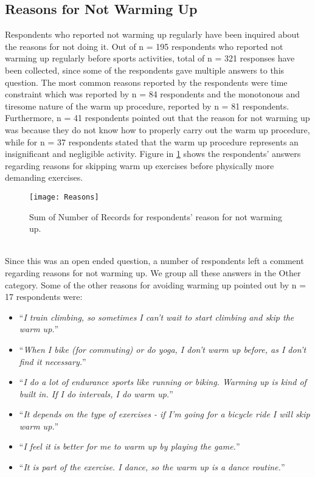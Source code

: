 \subsection{Reasons for Not Warming Up}
Respondents who reported not warming up regularly have been inquired about the reasons for not doing it.  Out of n = 195 respondents who reported not warming up regularly before sports activities, total of n = 321 responses have been collected, since some of the respondents gave multiple answers to this question. The most common reasons reported by the respondents were time constraint which was reported by n = 84 respondents and the monotonous and tiresome nature of the warm up procedure, reported by n = 81 respondents. Furthermore, n = 41 respondents pointed out that the reason for not warming up was because they do not know how to properly carry out the warm up procedure, while for n = 37 respondents stated that the warm up procedure represents an insignificant and negligible activity. Figure in \ref{fig:Reasons} shows the respondents' answers regarding reasons for skipping warm up exercises before physically more demanding exercises.
\begin{figure}[h]
    \centering
    \texttt{[image: Reasons]}
    \caption{Sum of Number of Records for respondents' reason for not warming up.}
    \label{fig:Reasons}
\end{figure}\\
Since this was an open ended question, a number of respondents left a comment regarding reasons for not warming up. We group all these answers in the Other category. Some of the other reasons for avoiding warming up pointed out by n = 17 respondents were: 
\begin{itemize}
\item ``\textit{I train climbing, so sometimes I can't wait to start climbing and skip the warm up.}''
 \item ``\textit{When I bike (for commuting) or do yoga, I don't warm up before, as I don't find it necessary.}''
\item ``\textit{I do a lot of endurance sports like running or biking. Warming up is kind of built in. If I do intervals, I do warm up.}''
\item ``\textit{It depends on the type of exercises - if I'm going for a bicycle ride I will skip warm up.}''
\item ``\textit{I feel it is better for me to warm up by playing the game.}''
\item ``\textit{It is part of the exercise. I dance, so the warm up is a dance routine.}''
\end{itemize}
